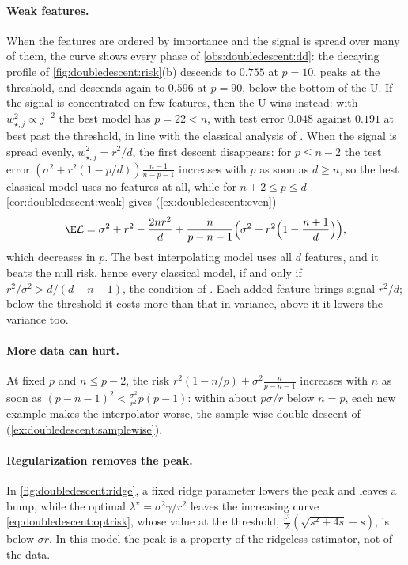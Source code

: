 \begin{refsection}
\paragraph{Weak features.} When the features are ordered by importance and the signal is spread over many of them, the curve shows every phase of \cref{obs:doubledescent:dd}: the decaying profile of \cref{fig:doubledescent:risk}(b) descends to $0.755$ at $p=10$, peaks at the threshold, and descends again to $0.596$ at $p=90$, below the bottom of the U. If the signal is concentrated on few features, then the U wins instead: with $w_{\star,j}^2\propto j^{-2}$ the best model has $p=22<n$, with test error $0.048$ against $0.191$ at best past the threshold, in line with the classical analysis of \textcite{BreimanFreedman1983}. When the signal is spread evenly, $w_{\star,j}^2=r^2/d$, the first descent disappears: for $p\le n-2$ the test error $(\sigma^2+r^2(1-p/d))\frac{n-1}{n-p-1}$ increases with $p$ as soon as $d\ge n$, so the best classical model uses no features at all, while for $n+2\le p\le d$ \cref{cor:doubledescent:weak} gives (\cref{ex:doubledescent:even})
\begin{equation}\label{eq:doubledescent:even}
  \E\Loss=\sigma^2+r^2-\frac{2nr^2}d+\frac n{p-n-1}\Bigl(\sigma^2+r^2\Bigl(1-\frac{n+1}d\Bigr)\Bigr),
\end{equation}
which decreases in $p$. The best interpolating model uses all $d$ features, and it beats the null risk, hence every classical model, if and only if $r^2/\sigma^2>d/(d-n-1)$, the condition of \textcite{BelkinEtAl2020}. Each added feature brings signal $r^2/d$; below the threshold it costs more than that in variance, above it it lowers the variance too.

\paragraph{More data can hurt.} At fixed $p$ and $n\le p-2$, the risk $r^2(1-n/p)+\sigma^2\frac n{p-n-1}$ increases with $n$ as soon as $(p-n-1)^2<\frac{\sigma^2}{r^2}p(p-1)$: within about $p\sigma/r$ below $n=p$, each new example makes the interpolator worse, the sample-wise double descent of \textcite{Nakkiran2019} (\cref{ex:doubledescent:samplewise}).

\paragraph{Regularization removes the peak.} In \cref{fig:doubledescent:ridge}, a fixed ridge parameter lowers the peak and leaves a bump, while the optimal $\lambda^\star=\sigma^2\gamma/r^2$ leaves the increasing curve \eqref{eq:doubledescent:optrisk}, whose value at the threshold, $\frac{r^2}2(\sqrt{s^2+4s}-s)$, is below $\sigma r$. In this model the peak is a property of the ridgeless estimator, not of the data.


\end{refsection}

